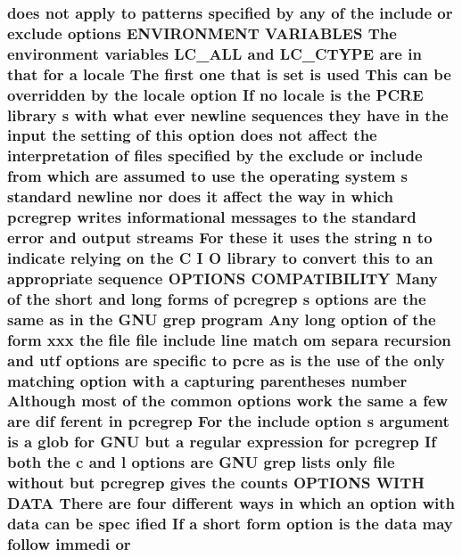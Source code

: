 \subsubsection[{\texorpdfstring{or}{or}}]{ does {\bf not} apply {\bf to} {\bf patterns} {\bf specified} by {\bf any} {\bf of} the {\bf include} or {\bf exclude} {\bf options} E\+N\+V\+I\+R\+O\+N\+M\+E\+NT V\+A\+R\+I\+A\+B\+L\+ES The {\bf environment} {\bf variables} L\+C\+\_\+\+A\+LL and L\+C\+\_\+\+C\+T\+Y\+PE {\bf are} {\bf in} that for {\bf a} {\bf locale} The {\bf first} one that {\bf is} {\bf set} {\bf is} {\bf used} This {\bf can} {\bf be} overridden by the {\bf locale} {\bf option} If no {\bf locale} {\bf is} the {\bf P\+C\+RE} {\bf library} {\bf s} {\bf with} {\bf what} {\bf ever} {\bf newline} sequences they have {\bf in} the {\bf input} the {\bf setting} {\bf of} {\bf this} {\bf option} does {\bf not} affect the interpretation {\bf of} {\bf files} {\bf specified} by the {\bf exclude} or {\bf include} {\bf from} {\bf which} {\bf are} assumed {\bf to} use the operating {\bf system} {\bf s} standard {\bf newline} nor does {\bf it} affect the {\bf way} {\bf in} {\bf which} pcregrep writes informational messages {\bf to} the standard {\bf error} and {\bf output} streams For these {\bf it} uses the {\bf string} {\bf n} {\bf to} indicate relying {\bf on} the {\bf C} {\bf I} O {\bf library} {\bf to} convert {\bf this} {\bf to} an appropriate {\bf sequence} {\bf O\+P\+T\+I\+O\+NS} C\+O\+M\+P\+A\+T\+I\+B\+I\+L\+I\+TY Many {\bf of} the short and long forms {\bf of} pcregrep {\bf s} {\bf options} {\bf are} the same {\bf as} {\bf in} the G\+NU {\bf grep} {\bf program} Any long {\bf option} {\bf of} the form {\bf xxx} the {\bf file} {\bf file} {\bf include} {\bf line} {\bf match} om separa {\bf recursion} and utf {\bf options} {\bf are} specific {\bf to} {\bf pcre} {\bf as} {\bf is} the use {\bf of} the only {\bf matching} {\bf option} {\bf with} {\bf a} capturing parentheses {\bf number} Although most {\bf of} the common {\bf options} work the same {\bf a} few {\bf are} dif ferent {\bf in} pcregrep For the {\bf include} {\bf option} {\bf s} {\bf argument} {\bf is} {\bf a} glob for G\+NU but {\bf a} regular {\bf expression} for pcregrep If both the {\bf c} and {\bf l} {\bf options} {\bf are} G\+NU {\bf grep} lists only {\bf file} without but pcregrep gives the {\bf counts} {\bf O\+P\+T\+I\+O\+NS} W\+I\+TH {\bf D\+A\+TA} There {\bf are} four different ways {\bf in} {\bf which} an {\bf option} {\bf with} {\bf data} {\bf can} {\bf be} spec ified If {\bf a} short form {\bf option} {\bf is} the {\bf data} may follow immedi or}\hypertarget{pcretest_8txt_a1e1dbf0220a28f9a8c394172dd6da171}{}\label{pcretest_8txt_a1e1dbf0220a28f9a8c394172dd6da171}
